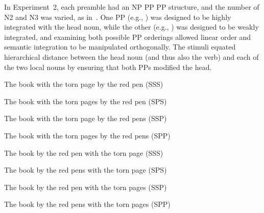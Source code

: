 \documentclass[12pt,titlepage]{article}
\begin{document}
In Experiment~2, each preamble had an NP PP PP structure, and the number of
N2 and N3 was varied, as in~.  One PP (e.g., ) was designed to be highly integrated with the head noun, while
the other (e.g., ) was designed to be weakly
integrated, and examining both possible PP orderings allowed linear order
and semantic integration to be manipulated orthogonally.  The stimuli
equated hierarchical distance between the head noun (and thus also the
verb) and each of the two local nouns by ensuring that both PPs modified
the head.

\begin{myexample}
\label{HP2}
\begin{examples}
    
    \item \label{HP2-early-sss} The book with the torn page by the red
    pen \hfill (SSS)\hspace{12em}
    
    \item \label{HP2-early-sps} The book with the torn pages by the 
    red pen \hfill (SPS)\hspace{12em}

    \item \label{HP2-early-ssp} The book with the torn page by the red
    pens \hfill (SSP)\hspace{12em}
    
    \item \label{HP2-early-spp} The book with the torn pages by the red
    pens \hfill (SPP)\hspace{12em}
    
    \item \label{HP2-late-sss} The book by the red pen with the torn
    page \hfill (SSS)\hspace{12em}

    \item \label{HP2-late-sps} The book by the red pens with the torn 
    page \hfill (SPS)\hspace{12em}

    \item \label{HP2-late-ssp} The book by the red pen with the torn 
    pages \hfill (SSP)\hspace{12em}

    \item \label{HP2-late-spp} The book by the red pens with the torn 
    pages \hfill (SPP)\hspace{12em}
    
\end{examples}
\end{myexample}
\end{document}
